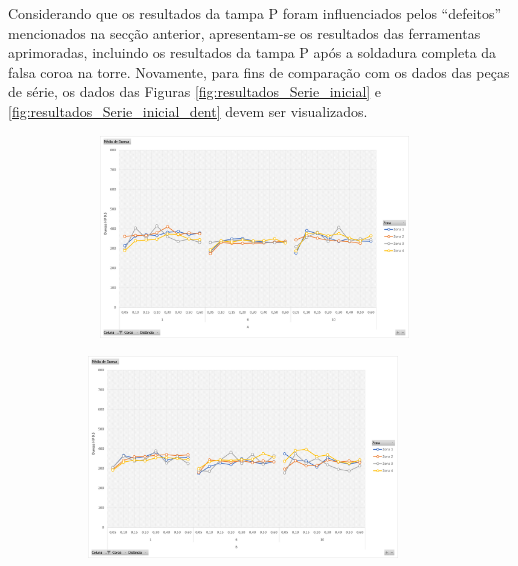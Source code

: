 Considerando que os resultados da tampa P foram influenciados pelos “defeitos” mencionados na secção anterior, apresentam-se os resultados das ferramentas aprimoradas, incluindo os resultados da tampa P após a soldadura completa da falsa coroa na torre. Novamente, para fins de comparação com os dados das peças de série, os dados das Figuras \ref{fig:resultados_Serie_inicial} e \ref{fig:resultados_Serie_inicial_dent} devem ser visualizados.
\begin{figure}[htb]
    \centering
    \begin{subfigure}{.4\textwidth}\
        \centering
        \includegraphics[width = 0.9\textwidth]{Figures/Cap4/Grafico_4_Zonas_Y.png}
        \caption{}
        \label{fig:resultados_Tampa_Y}
    \end{subfigure}%
    \begin{subfigure}{.4\textwidth}
        \centering
        \includegraphics[width = 0.9\textwidth]{Figures/Cap4/Grafico_4_Zonas_O.png}
        \caption{}
        \label{fig:resultados_Tampa_O}

\end{subfigure}
\end{figure}
